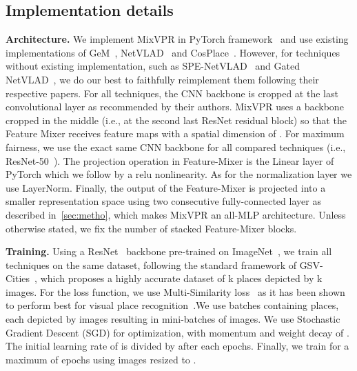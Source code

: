 \documentclass[10pt,twocolumn,letterpaper]{article}
\begin{document}
\subsection{Implementation details}
\noindent\textbf{Architecture.} We implement MixVPR in PyTorch framework~\cite{paszke2019pytorch} and use existing implementations of GeM~\cite{radenovic2018fine}, NetVLAD~\cite{arandjelovic2016netvlad} and CosPlace~\cite{berton2022rethinking}. However, for techniques without existing implementation, such as SPE-NetVLAD~\cite{yu2019spatial} and Gated NetVLAD~\cite{zhang2021vector}, we do our best to faithfully reimplement them following their respective papers.
For all techniques, the CNN backbone is cropped at the last convolutional layer as recommended by their authors. MixVPR uses a backbone cropped in the middle (i.e., at the second last ResNet residual block) so that the Feature Mixer receives feature maps with a spatial dimension of .
For maximum fairness, we use the exact same CNN backbone for all compared techniques (i.e., ResNet-50~\cite{he2016deep}).
The projection operation in Feature-Mixer is the Linear layer of PyTorch which we follow by a relu nonlinearity. As for the normalization layer we use LayerNorm. Finally, the output of the Feature-Mixer is projected into a smaller representation space using two consecutive fully-connected layer as described in~\ref{sec:metho}, which makes MixVPR an all-MLP architecture. Unless otherwise stated, we fix  the number of stacked Feature-Mixer blocks.

\noindent\textbf{Training.} Using a ResNet~\cite{he2016deep} backbone pre-trained on ImageNet~\cite{krizhevsky2012imagenet}, we train all techniques on the same dataset, following the standard framework of GSV-Cities~\cite{gsvcities}, which proposes a highly accurate dataset of k places depicted by k images. For the loss function, we use Multi-Similarity loss~\cite{wang2019multi} as it has been shown to perform best for visual place recognition~\cite{gsvcities}.We use batches containing  places, each depicted by  images resulting in mini-batches of  images. We use Stochastic Gradient Descent (SGD) for optimization, with momentum  and weight decay of . The initial learning rate of  is divided by  after each  epochs. Finally, we train for a maximum of  epochs using images resized to .
\end{document}
